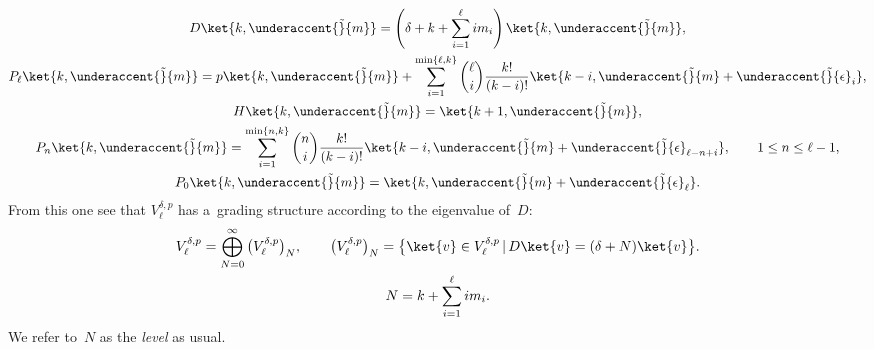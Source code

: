 \documentclass[pdftex]{sigma}
\numberwithin{equation}{section}
\begin{document}
\begin{gather*}
    D \ket{k,\underaccent{\tilde}{m}} = \left(\delta + k+ \sum\limits_{i=1}^{\ell} i   m_i\right) \ket{k,\underaccent{\tilde}{m}},
\nonumber
\\
    P_{\ell} \ket{k,\underaccent{\tilde}{m}} = p \ket{k,\underaccent{\tilde}{m}} + \sum\limits_{i=1}^{\min\{\ell,k\}}
\binom{\ell}{i} \frac{k!}{(k-i)!} \ket{k-i,\underaccent{\tilde}{m}+\underaccent{\tilde}{\epsilon}_{i}},
\nonumber
\\
    H \ket{k,\underaccent{\tilde}{m}}= \ket{k+1,\underaccent{\tilde}{m}},
\nonumber
\\
    P_n \ket{k,\underaccent{\tilde}{m}} = \sum\limits_{i=1}^{\min\{n,k\}} \binom{n}{i} \frac{k!}{(k-i)!}
\ket{k-i,\underaccent{\tilde}{m}+\underaccent{\tilde}{\epsilon}_{\ell-n+i}},
\qquad
1 \leq n \leq \ell-1,
\nonumber
\\
    P_0 \ket{k,\underaccent{\tilde}{m}} = \ket{k,\underaccent{\tilde}{m}+\underaccent{\tilde}{\epsilon}_{\ell}}.
\end{gather*}
From this one see that $ V^{\delta,p}_{\ell} $ has a~grading structure according to the eigenvalue of~$D$:
\begin{gather*}
    V^{\delta,p}_{\ell} = \bigoplus_{N=0}^{\infty} \big(V^{\delta,p}_{\ell}\big)_N,
\qquad
\big(V^{\delta,p}_{\ell}\big)_N = \big\{ \ket{v} \in V^{\delta,p}_{\ell} \, | \, D \ket{v} = (\delta+N) \ket{v} \big\}.
\\
    N = k+ \sum\limits_{i=1}^{\ell} i   m_i.
\end{gather*}
We refer to~$N$ as the \textit{level} as usual.
\end{document}
